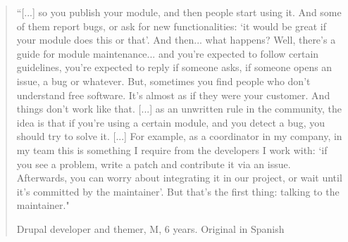 \begin{quotation}
``[...] so you publish your module, and then people start using it. And some of them report bugs, or ask for new functionalities: `it would be great if your module does this or that'. And then... what happens? Well, there's a guide for module maintenance... and you're expected to follow certain guidelines, you're expected to reply if someone asks, if someone opens an issue, a bug or whatever. But, sometimes you find people who don't understand free software. It's almost as if they were your customer. And things don't work like that. [...] as an unwritten rule in the community, the idea is that if you're using a certain module, and you detect a bug, you should try to solve it. [...] For example, as a coordinator in my company, in my team this is something I require from the developers I work with: `if you see a problem, write a patch and contribute it via an issue. Afterwards, you can worry about integrating it in our project, or wait until it's committed by the maintainer'. But that's the first thing: talking to the maintainer."
\begin{flushright}\footnotesize{Drupal developer and themer, M, 6 years. Original in Spanish}\end{flushright}
\end{quotation}

